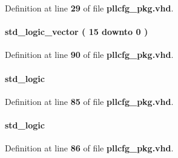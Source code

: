 Definition at line {\bf 29} of file {\bf pllcfg\+\_\+pkg.\+vhd}.

\paragraph[{pll\+\_\+lock}]{ {\bfseries \textcolor{comment}{std\+\_\+logic\+\_\+vector}\textcolor{vhdlchar}{ }\textcolor{vhdlchar}{(}\textcolor{vhdlchar}{ }\textcolor{vhdlchar}{ } \textcolor{vhdldigit}{15} \textcolor{vhdlchar}{ }\textcolor{keywordflow}{downto}\textcolor{vhdlchar}{ }\textcolor{vhdlchar}{ } \textcolor{vhdldigit}{0} \textcolor{vhdlchar}{ }\textcolor{vhdlchar}{)}\textcolor{vhdlchar}{ }} \hspace{0.3cm}{\ttfamily [Record]}}\label{classpllcfg__pkg_adf014809c2c3ebf524817e3384bccdfe}


Definition at line {\bf 90} of file {\bf pllcfg\+\_\+pkg.\+vhd}.

\paragraph[{pllcfg\+\_\+busy}]{ {\bfseries \textcolor{comment}{std\+\_\+logic}\textcolor{vhdlchar}{ }} \hspace{0.3cm}{\ttfamily [Record]}}\label{classpllcfg__pkg_a85196189b09f61002ddbfeebd1350bdd}


Definition at line {\bf 85} of file {\bf pllcfg\+\_\+pkg.\+vhd}.

\paragraph[{pllcfg\+\_\+done}]{ {\bfseries \textcolor{comment}{std\+\_\+logic}\textcolor{vhdlchar}{ }} \hspace{0.3cm}{\ttfamily [Record]}}\label{classpllcfg__pkg_a6e5c7648d808c0b8cd0e1b2fdc8bc17a}


Definition at line {\bf 86} of file {\bf pllcfg\+\_\+pkg.\+vhd}.

